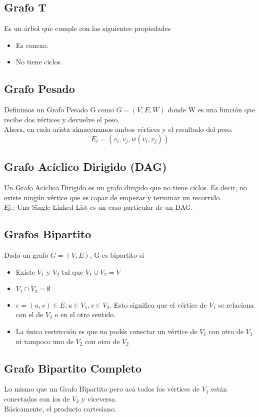 \documentclass[10pt,a4paper]{article}
\begin{document}
\subsection*{Grafo T}
Es un árbol que cumple con las siguientes propiedades
\begin{itemize}
    \item Es conexo.
    \item No tiene ciclos. 
\end{itemize}
\subsection*{Grafo Pesado}
Definimos un Grafo Pesado G como $G = (V, E, W)$ donde W es una función que recibe dos vértices y devuelve el peso. \\
Ahora, en cada arista almacenamos ambos vértices y el resultado del peso. 
\[E_{i} = (v_{i}, v_{j}, w(v_{i},v_{j}))\]
\subsection*{Grafo Acíclico Dirigido (DAG)}
Un Grafo Acíclico Dirigido es un grafo dirigido que no tiene ciclos. Es decir, no existe ningún vértice que es capaz de empezar y terminar un recorrido. \\
Ej.: Una Single Linked List es un caso particular de un DAG.
\subsection*{Grafos Bipartito}
Dado un grafo $G = (V, E)$, G es bipartito si
\begin{itemize}
    \item Existe $V_{1}$ y $V_{2}$ tal que $V_{1} \cup V_{2} = V$
    \item $V_{1} \cap V_{2} = \emptyset$
    \item $e = (u,v) \in E, u \in V_{1}, v \in V_{2}$. Esto significa que el vértice de $V_{1}$ se relaciona con el de $V_{2}$ o en el otro sentido. 
    \item La única restricción es que no podés conectar un vértice de $V_{1}$ con otro de $V_{1}$ ni tampoco uno de $V_{2}$ con otro de $V_{2}$
\end{itemize}
\subsection*{Grafo Bipartito Completo}
Lo mismo que un Grafo Bipartito pero acá todos los vértices de $V_{1}$ están conectados con los de $V_{2}$ y viceversa. \\
Básicamente, el producto cartesiano.
\end{document}
